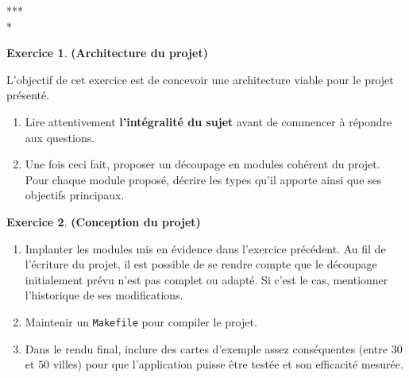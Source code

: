 \documentclass[12pt]{article}
\theoremstyle{definition}
\newtheorem{Exercice}{Exercice}
\begin{document}
\begin{center} *** \\ * \end{center}
\bigskip
\bigskip

\begin{Exercice} {\bf (Architecture du projet)}\smallskip

L'objectif de cet exercice est de concevoir une architecture viable pour
le projet présenté.
\smallskip

\begin{enumerate}
    \item Lire attentivement {\bf l'intégralité du sujet} avant de
    commencer à répondre aux questions.
    \smallskip

    \item Une fois ceci fait, proposer un découpage en modules cohérent
    du projet. Pour chaque module proposé, décrire les types qu'il
    apporte ainsi que ses objectifs principaux.
\end{enumerate}
\end{Exercice}
\bigskip

\begin{Exercice} {\bf (Conception du projet)}\smallskip

\begin{enumerate}
    \item Implanter les modules mis en évidence dans l'exercice
    précédent. Au fil de l'écriture du projet, il est possible de se
    rendre compte que le découpage initialement prévu n'est pas complet
    ou adapté. Si c'est le cas, mentionner l'historique de ses
     modifications.
    \smallskip

    \item Maintenir un {\tt Makefile} pour compiler le projet.
    \smallskip

    \item Dans le rendu final, inclure des cartes d'exemple assez
    conséquentes (entre $30$ et $50$ villes) pour que l'application
    puisse être testée et son efficacité mesurée.
\end{enumerate}
\end{Exercice}
\bigskip
\end{document}
